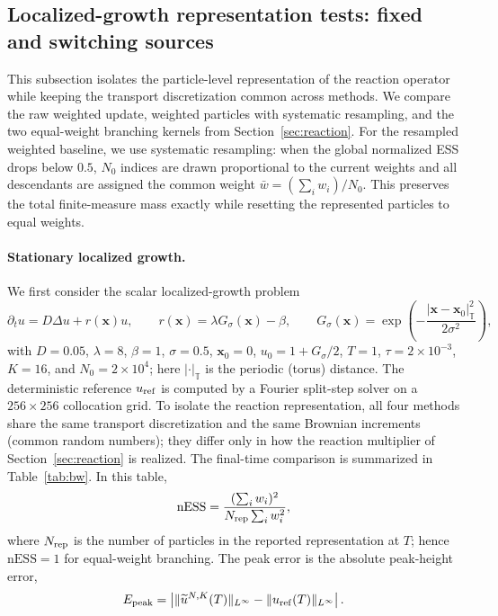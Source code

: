\documentclass[a4paper,fleqn]{cas-sc}
\theoremstyle{definition}
\theoremstyle{remark}
\begin{document}
\subsection{Localized-growth representation tests: fixed and switching sources}
\label{sec:branch_vs_weight}
This subsection isolates the particle-level representation of the reaction operator while
keeping the transport discretization common across methods.  We compare the raw
weighted update, weighted particles with systematic resampling, and the two equal-weight
branching kernels from Section~\ref{sec:reaction}.  For the resampled weighted baseline,
we use systematic resampling: when the global normalized ESS drops below \(0.5\), \(N_0\)
indices are drawn proportional to the current weights and all descendants are assigned
the common weight \(\bar w=(\sum_i w_i)/N_0\).  This preserves the total finite-measure
mass exactly while resetting the represented particles to equal weights.
 
\paragraph{Stationary localized growth.}
We first consider the scalar localized-growth problem
\begin{equation}
\partial_t u=D\Delta u+r(\mathbf x)u,
\qquad
r(\mathbf x)=\lambda G_\sigma(\mathbf x)-\beta,
\qquad
G_\sigma(\mathbf x)=\exp\!\left(-\frac{|\mathbf x-\mathbf x_0|_{\mathbb T}^2}{2\sigma^2}\right),
\label{equ:loc_growth}
\end{equation}
with \(D=0.05\), \(\lambda=8\), \(\beta=1\), \(\sigma=0.5\), \(\mathbf x_0=0\),
\(u_0=1+G_\sigma/2\), \(T=1\), \(\tau=2\times10^{-3}\), \(K=16\), and
\(N_0=2\times10^4\); here \(|\cdot|_{\mathbb T}\) is the periodic (torus) distance.
The deterministic reference \(u_{\rm ref}\) is computed by a Fourier split-step solver on a
\(256\times256\) collocation grid.
To isolate the reaction representation, all four methods share the same transport
discretization and the same Brownian increments (common random numbers); they differ
only in how the reaction multiplier of Section~\ref{sec:reaction} is realized.
The final-time comparison is summarized in Table~\ref{tab:bw}.  In this table,
\[
\mathrm{nESS}
=
\frac{(\sum_i w_i)^2}{N_{\rm rep}\sum_i w_i^2},
\]
where \(N_{\rm rep}\) is the number of particles in the reported representation at
\(T\); hence \(\mathrm{nESS}=1\) for equal-weight branching.  The peak error is the absolute
peak-height error,
\[
E_{\rm peak}
=
\left|
\|\widetilde u^{N,K}(T)\|_{L^\infty}
-
\|u_{\rm ref}(T)\|_{L^\infty}
\right|.
\]
 
\end{document}
